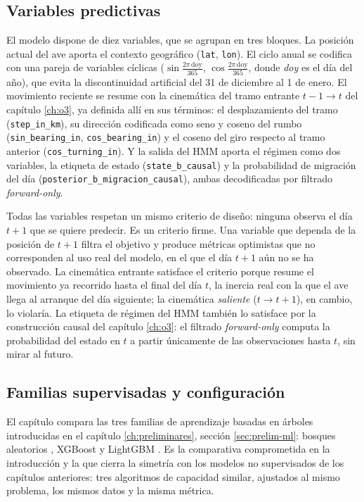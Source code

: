 \subsection{Variables predictivas}
\label{sec:o4-features}

El modelo dispone de diez variables, que se agrupan en tres bloques. La posición
actual del ave aporta el contexto geográfico (\texttt{lat}, \texttt{lon}). El ciclo
anual se codifica con una pareja de variables cíclicas
($\sin\!\tfrac{2\pi\, \mathrm{doy}}{365}$, $\cos\!\tfrac{2\pi\, \mathrm{doy}}{365}$,
donde \textit{doy} es el día del año), que evita la discontinuidad artificial del 31
de diciembre al 1 de enero. El movimiento reciente se resume con la cinemática del
tramo entrante $t\!-\!1 \!\to\! t$ del capítulo \ref{ch:o3}, ya definida allí en sus
términos: el desplazamiento del tramo (\texttt{step\_in\_km}), su dirección codificada
como seno y coseno del rumbo (\texttt{sin\_bearing\_in}, \texttt{cos\_bearing\_in}) y
el coseno del giro respecto al tramo anterior (\texttt{cos\_turning\_in}). Y la salida
del HMM aporta el régimen como dos variables, la etiqueta de estado
(\texttt{state\_b\_causal}) y la probabilidad de migración del día
(\texttt{posterior\_b\_migracion\_causal}), ambas decodificadas por filtrado
\textit{forward-only}.

Todas las variables respetan un mismo criterio de diseño: ninguna observa el día
$t+1$ que se quiere predecir. Es un criterio firme. Una variable que dependa de la
posición de $t+1$ filtra el objetivo y produce métricas optimistas que no
corresponden al uso real del modelo, en el que el día $t+1$ aún no se ha observado.
La cinemática entrante satisface el criterio porque resume el movimiento ya
recorrido hasta el final del día $t$, la inercia real con la que el ave llega al
arranque del día siguiente; la cinemática \emph{saliente} ($t \!\to\! t\!+\!1$), en
cambio, lo violaría. La etiqueta de régimen del HMM también lo satisface por la
construcción causal del capítulo \ref{ch:o3}: el filtrado \textit{forward-only} computa
la probabilidad del estado en $t$ a partir únicamente de las observaciones hasta $t$,
sin mirar al futuro.

\subsection{Familias supervisadas y configuración}
\label{sec:o4-modelos}

El capítulo compara las tres familias de aprendizaje basadas en árboles introducidas
en el capítulo \ref{ch:preliminares}, sección \ref{sec:prelim-ml}: bosques aleatorios
\cite{breiman2001}, XGBoost \cite{chen2016} y LightGBM \cite{ke2017}. Es la
comparativa comprometida en la introducción y la que cierra la simetría con los
modelos no supervisados de los capítulos anteriores: tres algoritmos de capacidad
similar, ajustados al mismo problema, los mismos datos y la misma métrica.

